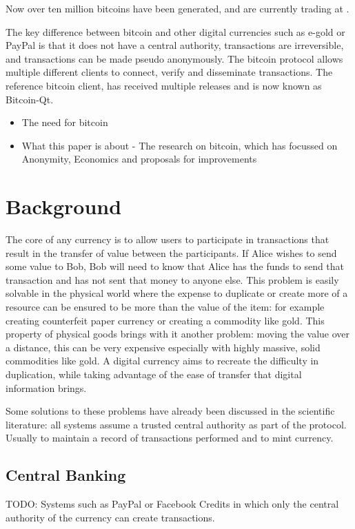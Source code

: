 Now over ten million bitcoins have been generated, and are currently trading at
.

The key difference between bitcoin and other digital currencies such as e-gold
or PayPal is that it does not have a central authority, transactions are
irreversible, and transactions can be made pseudo anonymously.  The bitcoin
protocol allows multiple different clients to connect, verify and disseminate
transactions.  The reference bitcoin client, has received multiple releases and
is now known as Bitcoin-Qt.

\begin{itemize} \item The need for bitcoin \item What this paper is about - The
    research on bitcoin, which has focussed on Anonymity, Economics and
    proposals for improvements \end{itemize}

\section{Background} The core of any currency is to allow users to participate
in transactions that result in the transfer of value between the participants.
If Alice wishes to send some value to Bob, Bob will need to know that Alice has
the funds to send that transaction and has not sent that money to anyone else.
This problem is easily solvable in the physical world where the expense to
duplicate or create more of a resource can be ensured to be more than the value
of the item: for example creating counterfeit paper currency or creating a
commodity like gold.  This property of physical goods brings with it another
problem: moving the value over a distance, this can be very expensive especially
with highly massive, solid commodities like gold.  A digital currency aims to
recreate the difficulty in duplication, while taking advantage of the ease of
transfer that digital information brings.

Some solutions to these problems have already been discussed in the scientific
literature: all systems assume a trusted central authority as part of the
protocol. Usually to maintain a record of transactions performed and to mint
currency.

\subsection{Central Banking} TODO: Systems such as PayPal or Facebook Credits in
which only the central authority of the currency can create transactions.

